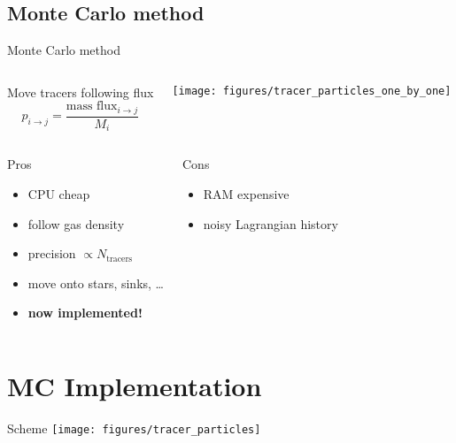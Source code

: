 \documentclass{beamer}
\begin{document}
\subsection{Monte Carlo method}
\begin{frame}{Monte Carlo method}

  \begin{columns}
    Move tracers following flux
    \begin{equation*}
      p_{i\rightarrow j} = \frac{\text{mass flux}_{i\rightarrow j}}{M_i}
    \end{equation*}

    \vspace{.3em}
    \texttt{[image: figures/tracer\_particles\_one\_by\_one]}
  \end{columns}
  \pause
  \begin{columns}
    \begin{block}{Pros}
      \begin{itemize}
      \item CPU cheap
      \item follow gas density
      \item precision $\propto N_\text{tracers}$
      \item move onto stars, sinks, \ldots{}
      \item \pause \textbf{now implemented!}
      \end{itemize}
    \end{block}

    \pause
    \begin{block}{Cons}
      \begin{itemize}
      \item RAM expensive
      \item noisy Lagrangian history
      \end{itemize}
    \end{block}
  \end{columns}
\end{frame}


\section{MC Implementation}

\begin{frame}{Scheme}
  \texttt{[image: figures/tracer\_particles]}
\end{frame}
\end{document}
